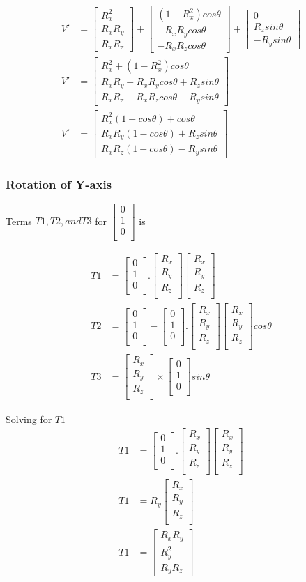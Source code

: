 \documentclass{article}
\newcommand{\yaxis}{
    \begin{bmatrix}
        0 \\
        1 \\
        0 \\
    \end{bmatrix}
}
\newcommand{\rotAxis}{
    \begin{bmatrix}
        R_x \\
        R_y \\
        R_z \\
    \end{bmatrix}
}
\newcommand{\vparallelForY}{
    \yaxis . \rotAxis 
    \rotAxis
}
\begin{document}
    \begin{align}
        V' &= 
        \begin{bmatrix} R_x^2 \\ R_xR_y \\ R_xR_z \end{bmatrix} +  
        \begin{bmatrix} (1-R_x^2)cos\theta \\ -R_xR_ycos\theta \\ -R_xR_zcos\theta \end{bmatrix} + 
        \begin{bmatrix} 0 \\ R_zsin\theta \\ -R_ysin\theta \end{bmatrix} \\
        V' &= 
        \begin{bmatrix}
            R_x^2 + (1-R_x^2)cos\theta \\ 
            R_xR_y - R_xR_ycos\theta + R_zsin\theta \\ 
            R_xR_z - R_xR_zcos\theta -R_ysin\theta  
        \end{bmatrix} \\
        V' &= 
        \begin{bmatrix}
            R_x^2(1 - cos\theta) + cos\theta \\ 
            R_xR_y(1 - cos\theta) + R_zsin\theta \\ 
            R_xR_z(1 - cos\theta) - R_ysin\theta  
        \end{bmatrix} \label{eq:xaxisAfterRotation} 
    \end{align}

    \subsubsection*{Rotation of Y-axis}

    Terms $T1,T2, and T3$ for $\yaxis$ is 

    \begin{align}
        T1 &= \vparallelForY \\
        T2 &= \yaxis - \vparallelForY cos\theta \\
        T3 &= \rotAxis \times \yaxis sin\theta 
    \end{align}

    Solving for $T1$
    \begin{align}
        T1 &= \vparallelForY \\
        T1 &= R_y \rotAxis \\
        T1 &= \begin{bmatrix} R_xR_y \\ R_y^2 \\ R_yR_z \end{bmatrix} 
    \end{align}
    
\end{document}
